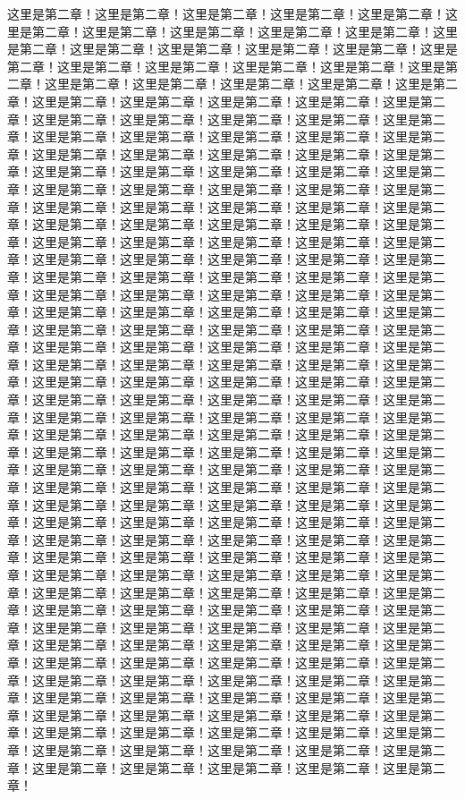 
这里是第二章！这里是第二章！这里是第二章！这里是第二章！这里是第二章！这里是第二章！这里是第二章！这里是第二章！这里是第二章！这里是第二章！这里是第二章！这里是第二章！这里是第二章！这里是第二章！这里是第二章！这里是第二章！这里是第二章！这里是第二章！这里是第二章！这里是第二章！这里是第二章！这里是第二章！这里是第二章！这里是第二章！这里是第二章！这里是第二章！这里是第二章！这里是第二章！这里是第二章！这里是第二章！这里是第二章！这里是第二章！这里是第二章！这里是第二章！这里是第二章！这里是第二章！这里是第二章！这里是第二章！这里是第二章！这里是第二章！这里是第二章！这里是第二章！这里是第二章！这里是第二章！这里是第二章！这里是第二章！这里是第二章！这里是第二章！这里是第二章！这里是第二章！这里是第二章！这里是第二章！这里是第二章！这里是第二章！这里是第二章！这里是第二章！这里是第二章！这里是第二章！这里是第二章！这里是第二章！这里是第二章！这里是第二章！这里是第二章！这里是第二章！这里是第二章！这里是第二章！这里是第二章！这里是第二章！这里是第二章！这里是第二章！这里是第二章！这里是第二章！这里是第二章！这里是第二章！这里是第二章！这里是第二章！这里是第二章！这里是第二章！这里是第二章！这里是第二章！这里是第二章！这里是第二章！这里是第二章！这里是第二章！这里是第二章！这里是第二章！这里是第二章！这里是第二章！这里是第二章！这里是第二章！这里是第二章！这里是第二章！这里是第二章！这里是第二章！这里是第二章！这里是第二章！这里是第二章！这里是第二章！这里是第二章！这里是第二章！这里是第二章！这里是第二章！这里是第二章！这里是第二章！这里是第二章！这里是第二章！这里是第二章！这里是第二章！这里是第二章！这里是第二章！这里是第二章！这里是第二章！这里是第二章！这里是第二章！这里是第二章！这里是第二章！这里是第二章！这里是第二章！这里是第二章！这里是第二章！这里是第二章！这里是第二章！这里是第二章！这里是第二章！这里是第二章！这里是第二章！这里是第二章！这里是第二章！这里是第二章！这里是第二章！这里是第二章！这里是第二章！这里是第二章！这里是第二章！这里是第二章！这里是第二章！这里是第二章！这里是第二章！这里是第二章！这里是第二章！这里是第二章！这里是第二章！这里是第二章！这里是第二章！这里是第二章！这里是第二章！这里是第二章！这里是第二章！这里是第二章！这里是第二章！这里是第二章！这里是第二章！这里是第二章！这里是第二章！这里是第二章！这里是第二章！这里是第二章！这里是第二章！这里是第二章！这里是第二章！这里是第二章！这里是第二章！这里是第二章！这里是第二章！这里是第二章！这里是第二章！这里是第二章！这里是第二章！这里是第二章！这里是第二章！这里是第二章！这里是第二章！这里是第二章！这里是第二章！这里是第二章！这里是第二章！这里是第二章！这里是第二章！这里是第二章！这里是第二章！这里是第二章！这里是第二章！这里是第二章！这里是第二章！这里是第二章！这里是第二章！这里是第二章！这里是第二章！这里是第二章！这里是第二章！这里是第二章！这里是第二章！这里是第二章！这里是第二章！这里是第二章！这里是第二章！这里是第二章！这里是第二章！这里是第二章！这里是第二章！这里是第二章！这里是第二章！这里是第二章！这里是第二章！这里是第二章！这里是第二章！这里是第二章！这里是第二章！这里是第二章！这里是第二章！这里是第二章！这里是第二章！这里是第二章！这里是第二章！这里是第二章！这里是第二章！这里是第二章！这里是第二章！这里是第二章！这里是第二章！这里是第二章！